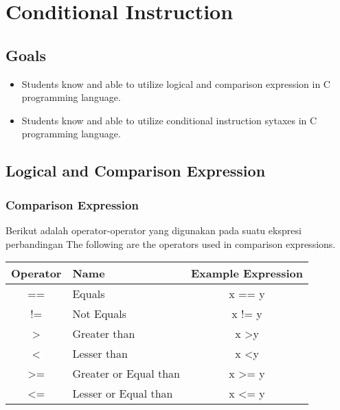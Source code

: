 \chapter{Conditional Instruction}

\section{Goals}
\begin{itemize}
	\item Students know and able to utilize logical and comparison expression in C programming language.
	\item Students know and able to utilize conditional instruction sytaxes in C programming language.
\end{itemize}


\section{Logical and Comparison Expression}

\subsection{Comparison Expression}
Berikut adalah operator-operator yang digunakan pada suatu ekspresi perbandingan
The following are the operators used in comparison expressions.
\begin{center}
	\begin{tabular}{|c|l|c|}
		\hline
		Operator        & Name                                   & \multicolumn{1}{l|}{Example Expression} \\ \hline
		==              & Equals	                             & x == y                       \\ \hline
		!=              & Not Equals 	                         & x != y                       \\ \hline
		\textgreater{}  & Greater than                           & x \textgreater y             \\ \hline
		\textless{}     & Lesser than                            & x \textless y                \\ \hline
		\textgreater{}= & Greater or Equal than				 	 & x \textgreater{}= y          \\ \hline
		\textless{}=    & Lesser or Equal than           		 & x \textless{}= y             \\ \hline
	\end{tabular}
\end{center}

